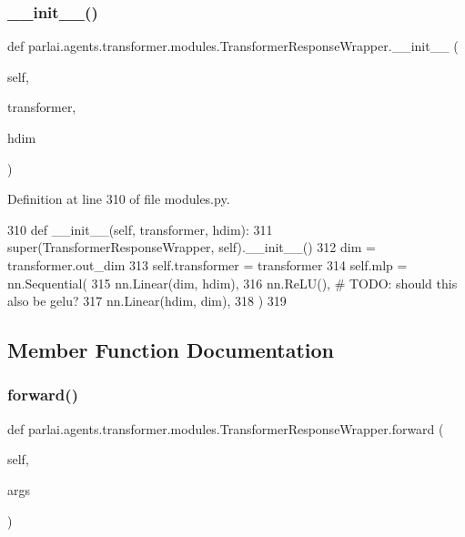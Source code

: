 \subsubsection{\texorpdfstring{\+\_\+\+\_\+init\+\_\+\+\_\+()}{\_\_init\_\_()}}
{\footnotesize\ttfamily def parlai.\+agents.\+transformer.\+modules.\+Transformer\+Response\+Wrapper.\+\_\+\+\_\+init\+\_\+\+\_\+ (\begin{DoxyParamCaption}\item[{}]{self,  }\item[{}]{transformer,  }\item[{}]{hdim }\end{DoxyParamCaption})}



Definition at line 310 of file modules.\+py.


\begin{DoxyCode}
310     \textcolor{keyword}{def }\_\_init\_\_(self, transformer, hdim):
311         super(TransformerResponseWrapper, self).\_\_init\_\_()
312         dim = transformer.out\_dim
313         self.transformer = transformer
314         self.mlp = nn.Sequential(
315             nn.Linear(dim, hdim),
316             nn.ReLU(),  \textcolor{comment}{# TODO: should this also be gelu?}
317             nn.Linear(hdim, dim),
318         )
319 
\end{DoxyCode}


\subsection{Member Function Documentation}
\mbox{\label{classparlai_1_1agents_1_1transformer_1_1modules_1_1TransformerResponseWrapper_ad716cb3a5874f46b1aa4beb45ba1b944}} 
\subsubsection{\texorpdfstring{forward()}{forward()}}
{\footnotesize\ttfamily def parlai.\+agents.\+transformer.\+modules.\+Transformer\+Response\+Wrapper.\+forward (\begin{DoxyParamCaption}\item[{}]{self,  }\item[{}]{args }\end{DoxyParamCaption})}

